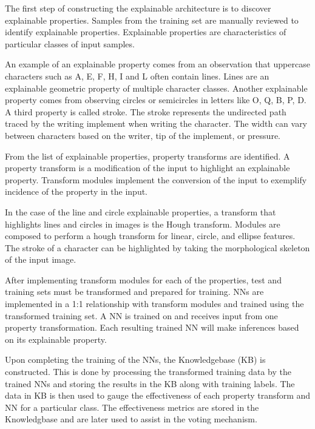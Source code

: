 \documentclass[conference]{IEEEtran}
\begin{document}

The first step of constructing the explainable architecture is to discover explainable properties.
Samples from the training set are manually reviewed to identify explainable
properties. Explainable properties are characteristics of particular classes of
input samples.

An example of an explainable property comes from an observation that uppercase
characters such as A, E, F, H, I and L often contain lines. Lines are an
explainable geometric property of multiple character classes. Another
explainable property comes from observing circles or semicircles in letters like
O, Q, B, P, D. A third property is called stroke.  The stroke represents the
undirected path traced by the writing implement when writing the character.  The
width can vary between characters based on the writer, tip of the implement, or
pressure.

From the list of explainable properties, property transforms are identified.  A
property transform is a modification of the input to highlight an explainable
property.  Transform modules implement the conversion of the input to exemplify
incidence of the property in the input.

In the case of the line and circle explainable properties, a transform that
highlights lines and circles in images is the Hough
transform\cite{Hough1959qva}.  Modules are composed to perform a hough
transform for linear, circle, and ellipse features.  The stroke of a character
can be highlighted by taking the morphological skeleton\cite{LEE1994} of the
input image.

After implementing transform modules for each of the properties, test and
training sets must be transformed and prepared for training. NNs are implemented
in a 1:1 relationship with transform modules and trained using the transformed
training set.  A NN is trained on and receives input from one property
transformation.  Each resulting trained NN will make inferences based on its
explainable property.

Upon completing the training of the NNs, the Knowledgebase (KB) is constructed.
This is done by processing the transformed training data by the trained NNs and
storing the results in the KB along with training labels.  The data in KB is
then used to gauge the effectiveness of each property transform and NN for a
particular class.  The effectiveness metrics are stored in the Knowledgbase and
are later used to assist in the voting mechanism.
\end{document}
